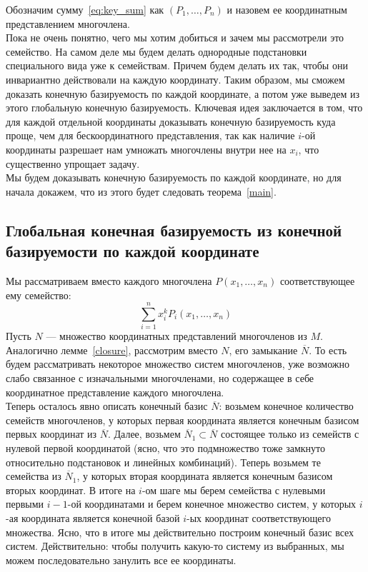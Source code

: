 Обозначим сумму~\eqref{eq:key_sum} как $(P_1,\ldots,P_n)$ и назовем ее координатным представлением многочлена.\\
Пока не очень понятно, чего мы хотим добиться и зачем мы рассмотрели это семейство.
На самом деле мы будем делать однородные подстановки специального вида уже к семействам.
Причем будем делать их так, чтобы они инвариантно действовали на каждую координату.
Таким образом, мы сможем доказать конечную базируемость по каждой координате, а потом уже выведем из этого глобальную конечную базируемость.
Ключевая идея заключается в том, что для каждой отдельной координаты доказывать конечную базируемость куда проще, чем для бескоординатного представления, так как наличие $i$-ой координаты разрешает нам умножать многочлены внутри нее на $x_i$, что существенно упрощает задачу.\\

Мы будем доказывать конечную базируемость по каждой координате, но для начала докажем, что из этого будет следовать теорема~\ref{main}.

\subsection{Глобальная конечная базируемость из конечной базируемости по каждой координате}\label{subsec:grishin-global-from-local}
Мы рассматриваем вместо каждого многочлена $P(x_1,\ldots,x_n)$ соответствующее ему семейство:
\[\sum\limits_{i=1}^n x_i^k P_i(x_1,\ldots,x_n)\] Пусть $N$ --- множество координатных представлений многочленов из $M$.
Аналогично лемме~\ref{closure}, рассмотрим вместо $N$, его замыкание $\overline{N}$.
То есть будем рассматривать некоторое множество систем многочленов, уже возможно слабо связанное с изначальными многочленами, но содержащее в себе координатное представление каждого многочлена.\\
Теперь осталось явно описать конечный базис $\overline{N}$: возьмем конечное количество семейств многочленов, у которых первая координата является конечным базисом первых координат из $\overline{N}$.
Далее, возьмем $\overline{N}_1\subset \overline{N}$ состоящее только из семейств с нулевой первой координатой (ясно, что это подмножество тоже замкнуто относительно подстановок и линейных комбинаций).
Теперь возьмем те семейства из $\overline{N}_1$, у которых вторая координата является конечным базисом вторых координат.
В итоге на $i$-ом шаге мы берем семейства с нулевыми первыми $i-1$-ой координатами и берем конечное множество систем, у которых $i$-ая координата является конечной базой $i$-ых координат соответствующего множества.
Ясно, что в итоге мы действительно построим конечный базис всех систем.
Действительно: чтобы получить какую-то систему из выбранных, мы можем последовательно занулить все ее координаты.

